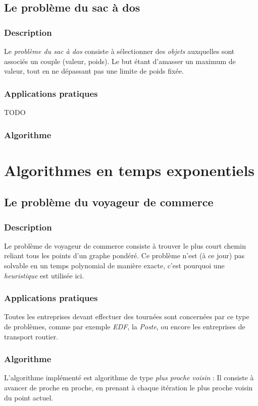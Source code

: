     \subsection{Le problème du sac à dos}
        \subsubsection{Description}
            Le \emph{problème du sac à dos} consiste à sélectionner
            des \emph{objets} auxquelles sont associés un couple (valeur, poids).
            Le but étant d'amasser un maximum de valeur, tout en ne dépassant
            pas une limite de poids fixée.
        \subsubsection{Applications pratiques}
            TODO
        \subsubsection{Algorithme}



\section{Algorithmes en temps exponentiels}
     \subsection{Le problème du voyageur de commerce}
        \subsubsection{Description}
                Le problème de voyageur de commerce consiste à trouver le plus
                court chemin reliant tous les points d'un graphe pondéré.
                Ce problème n'est (à ce jour) pas solvable en un temps
                polynomial de manière exacte, c'est pourquoi une \emph{heuristique}
                est utilisée ici.
        \subsubsection{Applications pratiques}
            Toutes les entreprises devant effectuer des tournées sont concernées
            par ce type de problèmes, comme par exemple \emph{EDF},
            la \emph{Poste}, ou encore les entreprises de transport routier.
        \subsubsection{Algorithme}
            L'algorithme implémenté est algorithme de type \emph{plus proche voisin} :
            Il consiste à avancer
            de proche en proche, en prenant à chaque itération le plus
            proche voisin du point actuel.

